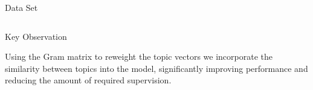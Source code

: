\documentclass[final]{beamer}
\newlength{\onecolwid}
\newlength{\twocolwid}
\begin{document}
\begin{frame}[t]
\begin{columns}[t]
\begin{column}{\twocolwid}
\begin{columns}[t,totalwidth=\twocolwid]
\begin{column}{\onecolwid}
\begin{block}{Data Set}
\end{block}


\end{column} %

\end{columns} %


\begin{alertblock}{Key Observation}

Using the Gram matrix to reweight the topic vectors we incorporate the similarity between topics into the model, significantly improving performance and reducing the amount of required supervision.

\end{alertblock} 






\end{column}
\end{columns}
\end{frame}
\end{document}
